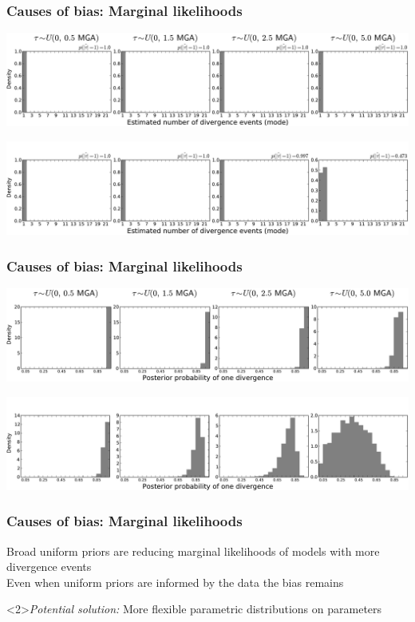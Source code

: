 \begin{frame}[t]
    \frametitle{Causes of bias: Marginal likelihoods}
    \vspace{1cm}
        \centerline{
        \includegraphics[width=\textwidth]{images/old-sims_power_psi_mode.pdf}}
        \vspace{0mm}
        \centerline{
        \includegraphics[width=\textwidth]{images/old-sims-inform10_power_psi_mode_headless.pdf}}
\end{frame}

\begin{frame}[t]
    \frametitle{Causes of bias: Marginal likelihoods}
    \vspace{1cm}
        \centerline{
        \includegraphics[width=\textwidth]{images/old-sims_power_psi_prob.pdf}}
        \vspace{0mm}
        \centerline{
        \includegraphics[width=\textwidth]{images/old-sims-inform10_power_psi_prob_headless.pdf}}
\end{frame}

\begin{frame}
    \frametitle{Causes of bias: Marginal likelihoods}
    Broad uniform priors are reducing marginal likelihoods of models with more
    divergence events\\
    \bigskip
    Even when uniform priors are informed by the data the bias remains\\
    \bigskip
    \begin{block}<2>{\it Potential solution:}
        More flexible parametric distributions on parameters
    \end{block}
\end{frame}

